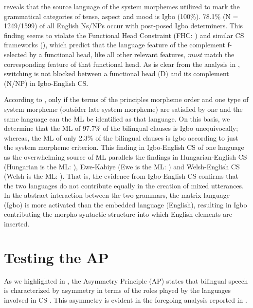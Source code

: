 \documentclass[output=paper]{langsci/langscibook}
\begin{document}
 reveals that the source language of the system morphemes utilized to mark the grammatical categories of tense, aspect and mood is Igbo (100\%). 78.1\% (N = 1249/1599) of all English Ns/NPs occur with post-posed Igbo determiners. This finding seems to violate the Functional Head Constraint (FHC: \citealt{BelaziEtAl1994}) and similar CS frameworks (), which predict that the language feature of the complement f-selected by a functional head, like all other relevant features, \textit{must} match the corresponding feature of that functional head. As is clear from the analysis in , switching is not blocked between a functional head (D) and its complement (N/NP) in Igbo-English CS. 

According to \citet[59]{MyersScotton2002}, only if the terms of the principles morpheme order and one type of system morpheme (outsider late system morpheme) are satisfied by one and the same language can the ML be identified as that language. On this basis, we determine that the ML of 97.7\% of the bilingual clauses is Igbo unequivocally; whereas, the ML of only 2.3\% of the bilingual clauses is Igbo according to just the system morpheme criterion. This finding in Igbo-English CS of one language as the overwhelming source of ML parallels the findings in Hungarian-English CS (Hungarian is the ML: \citealt{Bolonyai2005}), Ewe-Kabiye (Ewe is the ML: \citealt{Essizewa2007}) and Welsh-English CS (Welsh is the ML: \citealt{DaviesDeuchar2010}). That is, the evidence from Igbo-English CS confirms that the two languages do not contribute equally in the creation of mixed utterances. In the abstract interaction between the two grammars, the matrix language (Igbo) is more activated than the embedded language (English), resulting in Igbo contributing the morpho-syntactic structure into which English elements are inserted.  

\section{Testing the AP}\label{sec:ihemere:6}

As we highlighted in , the Asymmetry Principle (AP) states that bilingual speech is characterized by asymmetry in terms of the roles played by the languages involved in CS \citep[9]{MyersScotton2002}. This asymmetry is evident in the foregoing analysis reported in . 
\end{document}
